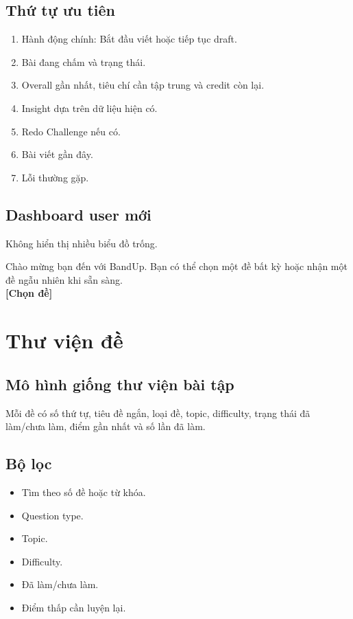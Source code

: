 \documentclass[11pt,a4paper]{article}
\begin{document}
\subsection{Thứ tự ưu tiên}
\begin{enumerate}
  \item Hành động chính: Bắt đầu viết hoặc tiếp tục draft.
  \item Bài đang chấm và trạng thái.
  \item Overall gần nhất, tiêu chí cần tập trung và credit còn lại.
  \item Insight dựa trên dữ liệu hiện có.
  \item Redo Challenge nếu có.
  \item Bài viết gần đây.
  \item Lỗi thường gặp.
\end{enumerate}

\subsection{Dashboard user mới}
Không hiển thị nhiều biểu đồ trống.
\begin{copybox}
Chào mừng bạn đến với BandUp. Bạn có thể chọn một đề bất kỳ hoặc nhận một đề ngẫu nhiên khi sẵn sàng.\\
\textbf{[Chọn đề]} 
\end{copybox}

\section{Thư viện đề}

\subsection{Mô hình giống thư viện bài tập}
Mỗi đề có số thứ tự, tiêu đề ngắn, loại đề, topic, difficulty, trạng thái đã làm/chưa làm, điểm gần nhất và số lần đã làm.

\subsection{Bộ lọc}
\begin{itemize}
  \item Tìm theo số đề hoặc từ khóa.
  \item Question type.
  \item Topic.
  \item Difficulty.
  \item Đã làm/chưa làm.
  \item Điểm thấp cần luyện lại.
\end{itemize}
\end{document}

